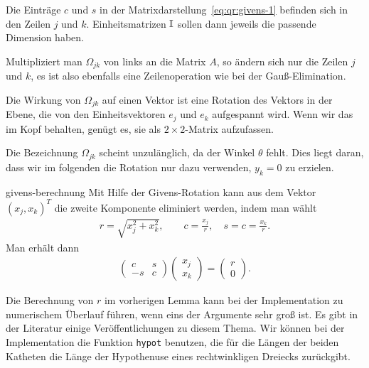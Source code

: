 \begin{remark}
  Die Einträge $c$ und $s$ in der
  Matrixdarstellung~\eqref{eq:qr:givens-1} befinden sich in den Zeilen
  $j$ und $k$. Einheitsmatrizen $\mathbb I$ sollen dann jeweils die passende
  Dimension haben.

  Multipliziert man $\Omega_{jk}$ von links an die Matrix $A$, so
  ändern sich nur die Zeilen $j$ und $k$, es ist also ebenfalls eine
  Zeilenoperation wie bei der Gauß-Elimination.

  Die Wirkung von $\Omega_{jk}$ auf einen Vektor ist eine Rotation des
  Vektors in der Ebene, die von den Einheitsvektoren $e_j$ und $e_k$
  aufgespannt wird. Wenn wir das im Kopf behalten, genügt es, sie als
  $2\times2$-Matrix aufzufassen.

  Die Bezeichnung $\Omega_{jk}$ scheint unzulänglich, da der Winkel
  $\theta$ fehlt. Dies liegt daran, dass wir im folgenden die Rotation
  nur dazu verwenden, $y_k=0$ zu erzielen.
\end{remark}

\begin{Lemma}{givens-berechnung}
  Mit Hilfe der Givens-Rotation kann aus dem Vektor $(x_j,x_k)^T$ die
  zweite Komponente eliminiert werden, indem man wählt
  \begin{gather}
    r = \sqrt{x_j^2+x_k^2},\qquad
    c = \frac{x_j}r,\quad s=c = \frac{x_k}r.
  \end{gather}
  Man erhält dann
  \begin{gather}
    \begin{pmatrix}
      c & s \\ -s & c
    \end{pmatrix}
    \begin{pmatrix}
      x_j\\x_k
    \end{pmatrix}
    =
    \begin{pmatrix}
      r\\0
    \end{pmatrix}
    .
  \end{gather}
\end{Lemma}

\begin{remark}
  Die Berechnung von $r$ im vorherigen Lemma kann bei der
  Implementation zu numerischem Überlauf führen, wenn eins der
  Argumente sehr groß ist. Es gibt in der Literatur einige
  Veröffentlichungen zu diesem Thema. Wir können bei der
  Implementation die Funktion \lstinline!hypot! benutzen, die für die
  Längen der beiden Katheten die Länge der Hypothenuse eines
  rechtwinkligen Dreiecks zurückgibt.
\end{remark}



